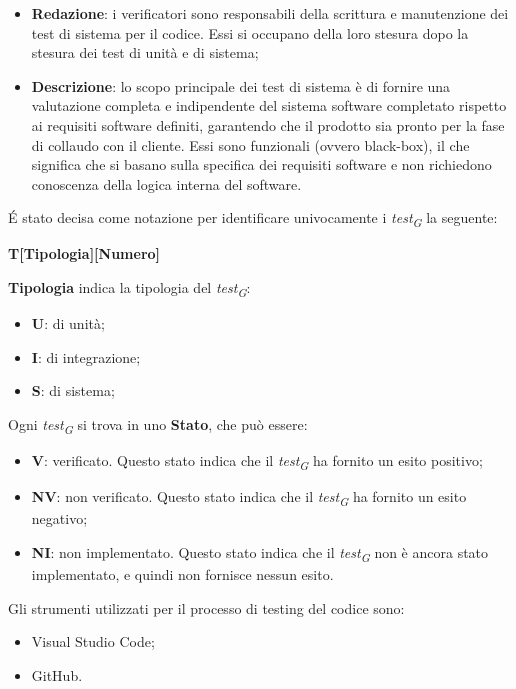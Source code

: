 \begin{itemize}
    \item \textbf{Redazione}: i verificatori sono responsabili della scrittura e manutenzione dei test di sistema per il codice. Essi si occupano della loro stesura dopo la stesura dei test di unità e di sistema;
    \item \textbf{Descrizione}: lo scopo principale dei test di sistema è di fornire una valutazione completa e indipendente del sistema software completato rispetto ai requisiti software definiti, garantendo che il prodotto sia pronto per la fase di collaudo con il cliente. Essi sono funzionali (ovvero black-box), il che significa che si basano sulla specifica dei requisiti software e non richiedono conoscenza della logica interna del software.
\end{itemize}

\'E stato decisa come notazione per identificare univocamente i \textit{test\textsubscript{G}} la seguente:
\begin{center}
    \textbf{T[Tipologia][Numero]}
\end{center}
\textbf{Tipologia} indica la tipologia del \textit{test\textsubscript{G}}:
\begin{itemize}
    \item \textbf{U}: di unità;
    \item \textbf{I}: di integrazione;
    \item \textbf{S}: di sistema;
\end{itemize}
Ogni \textit{test\textsubscript{G}} si trova in uno \textbf{Stato}, che può essere:
\begin{itemize}
    \item \textbf{V}: verificato. Questo stato indica che il \textit{test\textsubscript{G}} ha fornito un esito positivo;
    \item \textbf{NV}: non verificato. Questo stato indica che il \textit{test\textsubscript{G}} ha fornito un esito negativo;
    \item \textbf{NI}: non implementato. Questo stato indica che il \textit{test\textsubscript{G}} non è ancora stato implementato, e quindi non fornisce nessun esito.
\end{itemize}

Gli strumenti utilizzati per il processo di testing del codice sono:
\begin{itemize}
    \item Visual Studio Code;
    \item GitHub.
\end{itemize}

